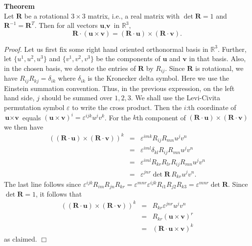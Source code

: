 \documentclass[12pt]{article}
\begin{document}
\newcommand{\vu}[0]{\textbf{u}}
\newcommand{\vv}[0]{\textbf{v}}
\newcommand{\vR}[0]{\textbf{R}}

{\bf Theorem} \\
Let $\vR$ be a rotational $3\times 3$ matrix, i.e., a real
matrix with $\det \vR = 1$ and $\vR^{-1} = \vR^T$.
Then for all vectors $\vu,\vv$ in $\mathbb{R}^3$,
$$ \vR \cdot (\vu\times \vv) = (\vR\cdot \vu)\times (\vR\cdot \vv).$$

\emph{Proof.}
Let us first fix some right hand oriented orthonormal basis in $\mathbb{R}^3$.
Further, let $\{u^1,u^2,u^3\}$ and $\{v^1,v^2,v^3\}$ be the components
of $\vu$ and
$\vv$ in that basis. Also, in the chosen basis, we denote the entries
of $\vR$ by $R_{ij}$. Since  $\vR$ is rotational, we have
$R_{ij} R_{kj} = \delta_{ik}$ where $\delta_{ik}$ is the
Kronecker delta symbol. Here we use the Einstein summation convention.
Thus, in the previous expression, on the left hand side, $j$ should be summed
over $1,2,3$. We shall use the
Levi-Civita permutation symbol $\varepsilon$ to write the cross product.
Then the $i$:th coordinate of $\vu\times \vv$ equals
$(\vu\times \vv)^i = \varepsilon^{ijk} u^j v^k$.
For the  $k$th component of $(\vR\cdot \vu)\times (\vR\cdot \vv)$ we
then have
\begin{eqnarray*}
((\vR\cdot \vu)\times (\vR\cdot \vv))^k &=& \varepsilon^{imk} R_{ij} R_{mn} u^j v^n \\
&=& \varepsilon^{iml} \delta_{kl} R_{ij} R_{mn} u^j v^n \\
&=& \varepsilon^{iml} R_{kr} R_{lr} R_{ij} R_{mn} u^j v^n \\
&=& \varepsilon^{jnr} \det \vR\, R_{kr} u^j v^n.
\end{eqnarray*}
The last line follows since
$\varepsilon^{ijk} R_{im} R_{jn} R_{kr} = \varepsilon^{mnr}\varepsilon^{ijk} R_{i1} R_{j2} R_{k3} = \varepsilon^{mnr} \det \vR$.
Since $\det \vR = 1$, it follows that
\begin{eqnarray*}
((\vR\cdot \vu)\times (\vR\cdot \vv))^k &=& R_{kr} \varepsilon^{jnr} u^j v^n\\
        &=& R_{kr} (\vu\times \vv)^r \\
        &=& (\vR\cdot \vu\times \vv)^k
\end{eqnarray*}
as claimed. $\Box$
\end{document}
